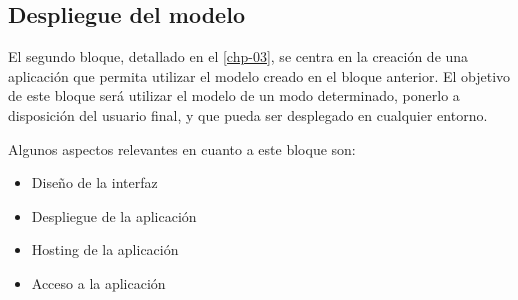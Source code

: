 \subsection{Despliegue del modelo}\label{sec:diseno-despliegue}

El segundo bloque, detallado en el \autoref{chp-03}, se centra en la creación de una aplicación que permita utilizar el modelo creado en el bloque anterior.
El objetivo de este bloque será utilizar el modelo de un modo determinado, ponerlo a disposición del usuario final, y que pueda ser desplegado en cualquier entorno.

Algunos aspectos relevantes en cuanto a este bloque son:

\begin{itemize}\itemsep1pt \parskip0pt 
    \item Diseño de la interfaz
    \item Despliegue de la aplicación
    \item Hosting de la aplicación
    \item Acceso a la aplicación
\end{itemize}



\endinput

